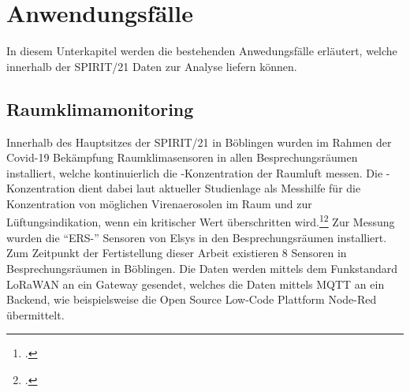 \section{Anwendungsfälle}
In diesem Unterkapitel werden die bestehenden Anwedungsfälle erläutert, welche innerhalb der SPIRIT/21 Daten zur Analyse liefern können.

\subsection{Raumklimamonitoring}
Innerhalb des Hauptsitzes der SPIRIT/21 in Böblingen wurden im Rahmen der Covid-19 Bekämpfung Raumklimasensoren in allen Besprechungsräumen installiert, welche kontinuierlich die \coo{}-Konzentration der Raumluft messen. Die \coo{}-Konzentration dient dabei laut aktueller Studienlage als Messhilfe für die Konzentration von möglichen Virenaerosolen im Raum und zur Lüftungsindikation, wenn ein kritischer Wert überschritten wird.\footcite[Vgl.][]{Hartmann.2020}\nzitat\footcite[Vgl.][]{Peng.2020} Zur Messung wurden die \enquote{ERS-\coo{}} Sensoren von Elsys in den Besprechungsräumen installiert. Zum Zeitpunkt der Fertistellung dieser Arbeit existieren 8 Sensoren in Besprechungsräumen in Böblingen. Die Daten werden mittels dem Funkstandard \ac{LoRaWAN} an ein Gateway gesendet, welches die Daten mittels \ac{MQTT} an ein Backend, wie beispielsweise die Open Source Low-Code Plattform Node-Red übermittelt. 

